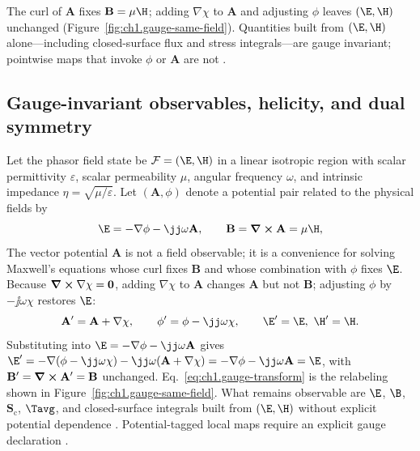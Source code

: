 The curl of $\mathbf{A}$ fixes $\mathbf{B}=\mu\H$; adding $\nabla\chi$ to $\mathbf{A}$ and adjusting $\phi$ leaves $(\E,\H)$ unchanged (Figure~\ref{fig:ch1.gauge-same-field}). Quantities built from $(\E,\H)$ alone---including closed-surface flux and stress integrals---are gauge invariant; pointwise maps that invoke $\phi$ or $\mathbf{A}$ are not \cite{stratton1941,belinfante1940}.
\subsection{Gauge-invariant observables, helicity, and dual symmetry}
\label{sec:ch01.4.3}

Let the phasor field state be \(\mathcal{F}=(\E,\H)\) in a linear isotropic region
with scalar permittivity \(\varepsilon\), scalar permeability \(\mu\), angular
frequency \(\omega\), and intrinsic impedance
\(\eta=\sqrt{\mu/\varepsilon}\). Let \((\mathbf{A},\phi)\) denote a potential pair
related to the physical fields by
\begin{equation}
\label{eq:ch1.potential-field-relations}
\E=-\nabla\phi-\jj\omega\mathbf{A},\qquad \mathbf{B}=\curl\mathbf{A}=\mu\H,
\end{equation}
The vector potential $\mathbf{A}$ is not a field observable; it is a convenience for solving Maxwell's equations whose curl fixes $\mathbf{B}$ and whose combination with $\phi$ fixes $\E$. Because $\curl\nabla\chi=\mathbf{0}$, adding $\nabla\chi$ to $\mathbf{A}$ changes $\mathbf{A}$ but not $\mathbf{B}$; adjusting $\phi$ by $-\jj\omega\chi$ restores $\E$:
\begin{equation}
\label{eq:ch1.gauge-transform}
\mathbf{A}'=\mathbf{A}+\nabla\chi,\qquad \phi'=\phi-\jj\omega\chi,\qquad \E'=\E,\ \H'=\H.
\end{equation}
Substituting into $\E=-\nabla\phi-\jj\omega\mathbf{A}$ gives
$\E'=-\nabla(\phi-\jj\omega\chi)-\jj\omega(\mathbf{A}+\nabla\chi)
=-\nabla\phi-\jj\omega\mathbf{A}=\E$,
with $\mathbf{B}'=\curl\mathbf{A}'=\mathbf{B}$ unchanged. Eq.~\eqref{eq:ch1.gauge-transform} is the relabeling shown in Figure~\ref{fig:ch1.gauge-same-field}. What remains observable are $\E$, $\B$, $\mathbf{S}_\mathrm{c}$, $\Tavg$, and closed-surface integrals built from $(\E,\H)$ without explicit potential dependence \cite{maxwell1873,belinfante1940}. \label{eq:ch1.gauge-observable-invariance}\label{eq:ch1.observable-admissibility-triad}\label{eq:ch1.observable-charge-continuous-triad}
Potential-tagged local maps require an explicit gauge declaration \cite{belinfante1940}.

